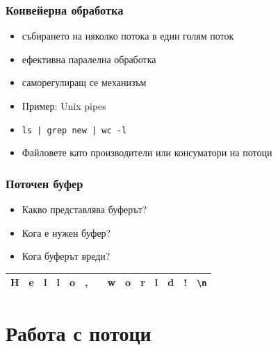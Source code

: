 \documentclass{beamer}
\begin{document}
\begin{frame}
  \frametitle{Конвейерна обработка}

  \begin{itemize}
  \item събирането на няколко потока в един голям поток
  \item ефективна паралелна обработка
  \item саморегулиращ се механизъм
  \item Пример: Unix pipes
  \item \tt{ls | grep new | wc -l}
  \item Файловете като производители или консуматори на потоци
  \end{itemize}
\end{frame}

\begin{frame}
  \frametitle{Поточен буфер}

  \begin{itemize}
  \item Какво представлява буферът?
  \item Кога е нужен буфер?
  \item Кога буферът вреди?
  \end{itemize}
  \vspace{2em}

  \begin{tabular}{|c|c|c|c|c|c|c|c|c|c|c|c|c|c|}
    \rowcolor{blue!60!green!40}
    \hline
    H&e&l&l&o&,& &w&o&r&l&d&!&\tt{\textbackslash n}\\
    \hline
  \end{tabular}
\end{frame}

\section{Работа с потоци}
\end{document}
